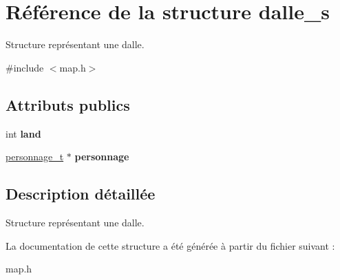 \hypertarget{structdalle__s}{}\section{Référence de la structure dalle\+\_\+s}
\label{structdalle__s}


Structure représentant une dalle.  




{\ttfamily \#include $<$map.\+h$>$}

\subsection*{Attributs publics}
\begin{DoxyCompactItemize}
\item 
\mbox{\label{structdalle__s_ac8d9f122d7f8759c62ceef1e3c8fbb45}} 
int {\bfseries land}
\item 
\mbox{\label{structdalle__s_a7bea502c234bada29f06ecc5e27c9f42}} 
\mbox{\hyperlink{structpersonnage__s}{personnage\+\_\+t}} $\ast$ {\bfseries personnage}
\end{DoxyCompactItemize}


\subsection{Description détaillée}
Structure représentant une dalle. 

La documentation de cette structure a été générée à partir du fichier suivant \+:\begin{DoxyCompactItemize}
\item 
map.\+h\end{DoxyCompactItemize}

